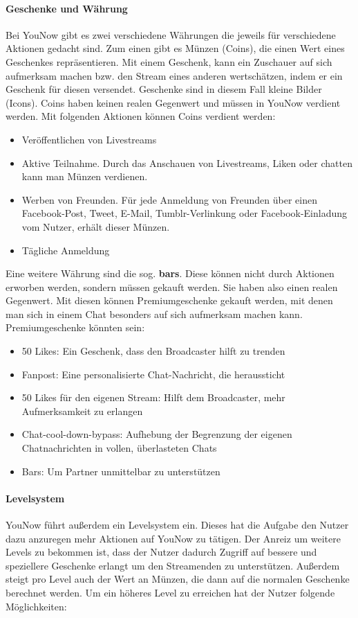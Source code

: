 \paragraph{Geschenke und Währung}
Bei YouNow gibt es zwei verschiedene Währungen die jeweils für verschiedene Aktionen gedacht sind. Zum einen gibt es Münzen (Coins), die einen Wert eines Geschenkes repräsentieren. Mit einem Geschenk, kann ein Zuschauer auf sich aufmerksam machen bzw. den Stream eines anderen wertschätzen, indem er ein Geschenk für diesen versendet. Geschenke sind in diesem Fall kleine Bilder (Icons).
Coins haben keinen realen Gegenwert und müssen in YouNow verdient werden. Mit folgenden Aktionen können Coins verdient werden:

\begin{itemize}
	\item Veröffentlichen von Livestreams
	\item Aktive Teilnahme. Durch das Anschauen von Livestreams, Liken oder chatten kann man Münzen verdienen.
	\item Werben von Freunden. Für jede
		Anmeldung von Freunden über einen Facebook-Post, Tweet, E-Mail,
		Tumblr-Verlinkung oder Facebook-Einladung vom Nutzer, erh\"alt dieser M\"unzen. 
	\item T\"agliche Anmeldung
\end{itemize} 

Eine weitere Währung sind die sog. \textbf{bars}. Diese können nicht durch Aktionen erworben werden, sondern müssen gekauft werden. Sie haben also einen realen Gegenwert. Mit diesen können Premiumgeschenke gekauft werden, mit denen man sich in einem Chat besonders auf sich aufmerksam machen kann. Premiumgeschenke könnten sein:

\begin{itemize}
	\item 50 Likes: Ein Geschenk, dass den Broadcaster hilft zu trenden
	\item Fanpost: Eine personalisierte Chat-Nachricht, die heraussticht 
	\item 50 Likes für den eigenen Stream: Hilft dem Broadcaster, mehr Aufmerksamkeit zu erlangen
	\item Chat-cool-down-bypass: Aufhebung der Begrenzung der eigenen Chatnachrichten in vollen, überlasteten Chats
	\item Bars: Um Partner unmittelbar zu unterstützen
\end{itemize}

\paragraph{Levelsystem}
YouNow führt außerdem ein Levelsystem ein. Dieses hat die Aufgabe den Nutzer dazu anzuregen mehr Aktionen auf YouNow zu tätigen. Der Anreiz um weitere Levels zu bekommen ist, dass der Nutzer dadurch Zugriff auf bessere und speziellere Geschenke erlangt um den Streamenden zu unterstützen. Außerdem steigt pro Level auch der Wert an Münzen, die dann auf die normalen Geschenke berechnet werden. 
Um ein höheres Level zu erreichen hat der Nutzer folgende Möglichkeiten:

